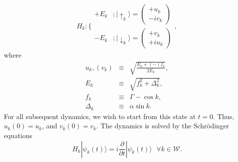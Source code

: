 \documentclass[a4paper,10pt]{article}
\begin{document}
\begin{equation}
\label{eq:unpert:esystem}
H_k:\bigg\{\begin{array}{ll}
           +E_k &;|\uparrow_k\rangle=\begin{pmatrix}
                                    +u_k\\
                                    -iv_k
                                   \end{pmatrix}\\
          -E_k &; |\downarrow_k\rangle = \begin{pmatrix}
                                           +v_k\\
                                           +iu_k
                                          \end{pmatrix}
           \end{array},
\end{equation}
where
\begin{eqnarray}
\label{eq:ukvk}
 u_k,(v_k) &\equiv& \sqrt{\frac{E_k+(-) f_k}{2E_k}},\nonumber \\
 E_k &\equiv& \sqrt{f^2_k+\Delta^2_k},\nonumber \\
 f_k &\equiv& \Gamma -\cos{k},\nonumber \\
 \Delta_k &\equiv& \alpha\sin{k}.
\end{eqnarray}
For all subsequent dynamics, we wish to start from this state at $t=0$. Thus, $u_k(0)=u_k$, and $v_k(0)=v_k$. The dynamics is solved by the Schr\"odinger equations
\begin{equation}
 \label{eq:schroedinger}
H_k|\psi_k(t)\rangle = i\frac{\partial}{\partial t}|\psi_k(t)\rangle \mbox{  } \forall k\in\mathcal{W}.
\end{equation}
\end{document}

